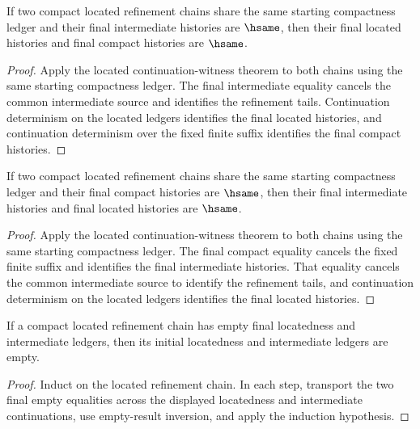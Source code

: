 \begin{theorem}
\label{thm:compact-located-refinement-chain-common-source-final-intermediate-tail-deterministic}
If two compact located refinement chains share the same starting compactness
ledger and their final intermediate histories are $\hsame$, then their final
located histories and final compact histories are $\hsame$.
\end{theorem}
\begin{proof}
Apply the located continuation-witness theorem to both chains using the same
starting compactness ledger. The final intermediate equality cancels the common
intermediate source and identifies the refinement tails. Continuation
determinism on the located ledgers identifies the final located histories, and
continuation determinism over the fixed finite suffix identifies the final
compact histories.
\end{proof}

\begin{theorem}
\label{thm:compact-located-refinement-chain-common-source-final-compact-tail-deterministic}
If two compact located refinement chains share the same starting compactness
ledger and their final compact histories are $\hsame$, then their final
intermediate histories and final located histories are $\hsame$.
\end{theorem}
\begin{proof}
Apply the located continuation-witness theorem to both chains using the same
starting compactness ledger. The final compact equality cancels the fixed
finite suffix and identifies the final intermediate histories. That equality
cancels the common intermediate source to identify the refinement tails, and
continuation determinism on the located ledgers identifies the final located
histories.
\end{proof}

\begin{theorem}
\label{thm:compact-located-refinement-chain-empty-final-reflects-empty-initial}
If a compact located refinement chain has empty final locatedness and intermediate ledgers, then its initial locatedness and intermediate ledgers are empty.
\end{theorem}
\begin{proof}
Induct on the located refinement chain. In each step, transport the two final empty equalities across the displayed locatedness and intermediate continuations, use empty-result inversion, and apply the induction hypothesis.
\end{proof}

